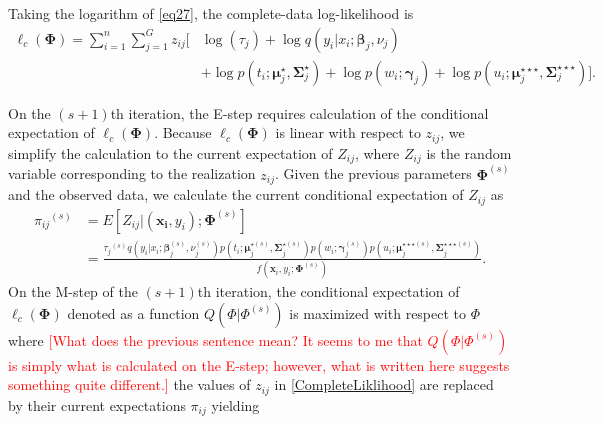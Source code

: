 \documentclass[12pt,letterpaper]{article}
\numberwithin{equation}{section}
\numberwithin{equation}{section}
\numberwithin{equation}{section}
\begin{document}
%
Taking the logarithm of \eqref{eq27}, the complete-data log-likelihood is 
\begin{align}
\ell_c(\bm\Phi)= \sum_{i=1}^{n}\sum_{j=1}^{G}{z_{ij}}\big[&\log(\tau_{j}) + \log{q}(y_i|x_i; \bm{\beta}_j,\nu_j)\nonumber\\&+  \log p(t_i; \bm{\mu}_j^{\star}, \bm{\Sigma}_j^{\star}) + \log p(w_i; \bm{\gamma}_j) +\log {p}(u_i; \bm{\mu}_j^{\star\star\star},\bm{\Sigma}_j^{\star\star\star}) \big].\label{CompleteLiklihood}
\end{align}

On the $(s+1)$th iteration, the E-step requires calculation of the conditional expectation of $\ell_c(\bm\Phi)$. Because $\ell_c(\bm\Phi)$ is linear with respect to  $z_{ij}$, we simplify the calculation to the current expectation of $Z_{ij}$, where $Z_{ij}$ is the random variable corresponding to the realization $z_{ij}$. Given the previous parameters $\bm\Phi^{(s)}$ and the observed data,  we calculate the current conditional expectation of $Z_{ij}$ as
\begin{equation*}\begin{split}
    {\pi_{ij}}^{(s)} &= {E}[Z_{ij} |(\bm{x_i}, y_i); \bm{\Phi}^{(s)}]\\
     &= \frac{{\tau_j}^{(s)}q(y_i|x_i; \bm \beta_j^{(s)}, \nu^{(s)}_{j})p(t_i; \bm\mu_j^{{\star}(s)}, \bm\Sigma_j^{{\star}(s)}) p(w_i; \bm \gamma_j^{(s)})p(u_i; \bm{\mu}_j^{\star\star\star (s)},\bm{\Sigma}_j^{\star\star\star (s)})}{f(\bm{x}_i, y_i; \bm{\Phi}^{(s)})
\label{eq29}                       }.
\end{split}\end{equation*}
%
On the M-step of the $(s+1)$th iteration, the conditional expectation of $\ell_c(\bm\Phi)$ denoted as a function $Q(\Phi|\Phi^{(s)})$ is maximized with respect to $\Phi $ where  \textcolor{red}{[What does the previous sentence mean? It seems to me that $Q(\Phi|\Phi^{(s)})$ is simply what is calculated on the E-step; however, what is written here suggests something quite different.]} the values of $z_{ij}$ in \eqref{CompleteLiklihood} are replaced by their current expectations $\pi_{ij}$ yielding 
\end{document}
